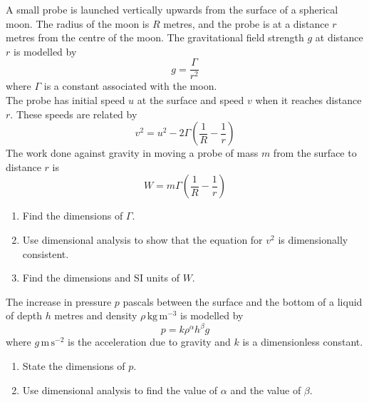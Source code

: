 \documentclass[leqno]{article}
\begin{document}
\begin{enumerate}[
  label=\textbf{\arabic*.},
  leftmargin=*,
  topsep=0pt,
  partopsep=0pt,
  parsep=0pt
]
A small probe is launched vertically upwards from the surface of a spherical moon. The radius of the moon is $R$ metres, and the probe is at a distance $r$ metres from the centre of the moon. The gravitational field strength $g$ at distance $r$ is modelled by
\[
g = \frac{\Gamma}{r^2}
\]
where $\Gamma$ is a constant associated with the moon. \\

The probe has initial speed $u$ at the surface and speed $v$ when it reaches distance $r$. These speeds are related by
\[
v^2 = u^2 - 2\Gamma\left(\frac{1}{R}-\frac{1}{r}\right)
\]
The work done against gravity in moving a probe of mass $m$ from the surface to distance $r$ is
\[
W = m\Gamma\left(\frac{1}{R}-\frac{1}{r}\right)
\]

\begin{enumerate}[label=\textbf{(\alph*)}]
  \item Find the dimensions of $\Gamma$. 
  \item Use dimensional analysis to show that the equation for $v^2$ is dimensionally consistent. 
  \item Find the dimensions and SI units of $W$. 
\end{enumerate}

\newpage

\questionitem

The increase in pressure $p$ pascals between the surface and the bottom of a liquid of depth $h$ metres and density $\rho\,\mathrm{kg\,m^{-3}}$ is modelled by
\[
p = k\rho^{\alpha}h^{\beta}g
\]
where $g\,\mathrm{m\,s^{-2}}$ is the acceleration due to gravity and $k$ is a dimensionless constant. \\
\begin{enumerate}[label=\textbf{(\alph*)}]
  \item State the dimensions of $p$.  \\
  \item Use dimensional analysis to find the value of $\alpha$ and the value of $\beta$.  \\
\end{enumerate}

\newpage

\questionitem


\end{enumerate}
\end{document}
